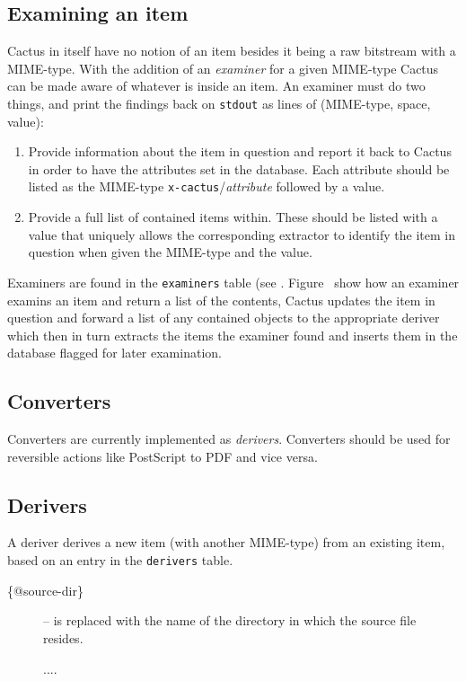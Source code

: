 \subsection{Examining an item}

Cactus in itself have no notion of an item besides it being
a raw bitstream with a MIME-type.  With the addition of an \textit{examiner} for a given MIME-type
Cactus can be made aware of whatever is inside an
item.  An examiner must do two things, and print the
findings back on \texttt{stdout} as lines of 
(MIME-type, space, value):

\begin{enumerate}
\item Provide information about the item in question and report it
  back to Cactus in order to have the attributes set in the database.
  Each attribute should be listed as the MIME-type
  \texttt{x-cactus}/\textit{attribute} followed by a value.
  
\item Provide a full list of contained items within.  These should be
  listed with a value that uniquely allows the corresponding extractor
  to identify the item in question when given the MIME-type and the
  value.
\end{enumerate}

Examiners are found in the \texttt{examiners} table (see
.  Figure~
show how an examiner examins an item and return a list of
the contents, Cactus updates the item in question and
forward a list of any contained objects to the appropriate
deriver which then in turn extracts the items the examiner
found and inserts them in the database flagged for later
examination.



\subsection{Converters}

Converters are currently implemented as \textit{derivers}.
Converters should be used for reversible actions like
PostScript to PDF and vice versa.

\subsection{Derivers}

A deriver derives a new item (with another MIME-type) from
an existing item, based on an entry in the \texttt{derivers}
table.
\begin{description}
\item[\{@source-dir\}]  -- is replaced with the name of the directory in which the source file resides.  

\textsf{....}


\end{description}

